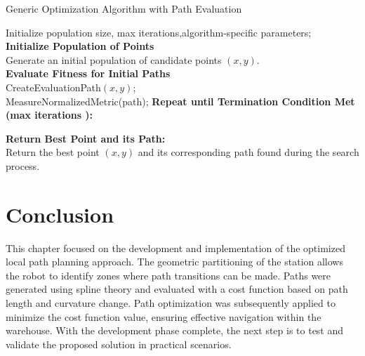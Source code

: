 \begin{algorithm}[H]
    \caption{Generic Optimization Algorithm with Path Evaluation}\label{optimization}
    
    
    Initialize  
    population size, max iterations,algorithm-specific parameters;\\
    \textbf{Initialize Population of Points}\\
    Generate an initial population of candidate points $(x, y)$.\\

    \textbf{Evaluate Fitness for Initial Paths}\\
    CreateEvaluationPath$(x, y)$;\\
    MeasureNormalizedMetric(path);    
    \textbf{Repeat until Termination Condition Met (max iterations ):}\\
    
    \textbf{Return Best Point and its Path:}\\
    Return the best point $(x, y)$ and its corresponding path found during the search process.
    \end{algorithm}

    

\section*{Conclusion}

This chapter focused on the development and implementation of the optimized local path planning 
approach. The geometric partitioning of the station allows the robot to identify zones where path 
transitions can be made. Paths were generated using spline theory and evaluated with a cost function 
based on path length and curvature change. Path optimization was subsequently applied to minimize the cost 
function value, ensuring effective navigation within the warehouse. With the development phase complete, 
the next step is to test and validate the proposed solution in practical scenarios.